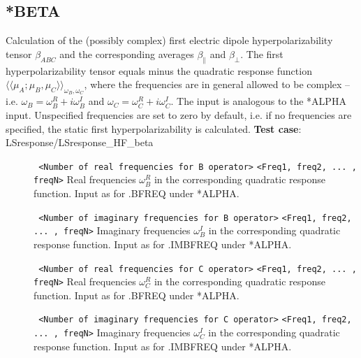 \subsection{*BETA}\label{subsec:beta}
Calculation of the (possibly complex) first electric dipole 
hyperpolarizability tensor $\beta_{ABC}$ and 
the corresponding averages $\beta_{\parallel}$ and
$\beta_{\perp}$. 
The first hyperpolarizability tensor equals minus the quadratic response function
$\langle\langle \mu_A; \mu_B, \mu_C \rangle\rangle_{\omega_B, \omega_C}$, where
the frequencies are in general allowed to be complex --
i.e. $\omega_B = \omega_B^R + i \omega_B^I$ and
$\omega_C = \omega_C^R + i \omega_C^I$.
The input is analogous to the *ALPHA input.
Unspecified frequencies are set to zero by default,
i.e. if no frequencies are specified, the static first hyperpolarizability is calculated. \newline
{\bf Test case}: LSresponse/LSresponse\_HF\_beta 
\begin{description}
\item[] \verb| | %
\verb|<Number of real frequencies for B operator>|%
\verb|<Freq1, freq2, ... , freqN>|%
Real frequencies $\omega_B^R$ in the corresponding quadratic response function.
Input as for .BFREQ under *ALPHA.
\item[] \verb| | \newline
\verb|<Number of imaginary frequencies for B operator>|\newline
\verb|<Freq1, freq2, ... , freqN>|\newline
Imaginary frequencies $\omega_B^I$ in the corresponding quadratic response function.
Input as for .IMBFREQ under *ALPHA.
\item[] \verb| | \newline
\verb|<Number of real frequencies for C operator>|\newline
\verb|<Freq1, freq2, ... , freqN>|\newline
Real frequencies $\omega_C^R$ in the corresponding quadratic response function.
Input as for .BFREQ under *ALPHA.
\item[] \verb| | \newline
\verb|<Number of imaginary frequencies for C operator>|\newline
\verb|<Freq1, freq2, ... , freqN>|\newline
Imaginary frequencies $\omega_C^I$ in the corresponding quadratic response function.
Input as for .IMBFREQ under *ALPHA.
\end{description}

